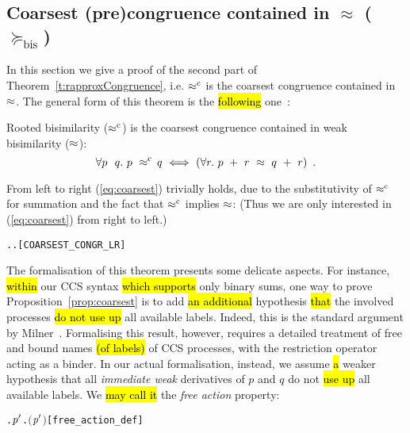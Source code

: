 
\subsection{Coarsest (pre)congruence contained in $\approx$ ($\succeq_{\mathrm{bis}}$)}
\label{s:coarsest}

In this section we give a proof of the second part of
Theorem~\ref{t:rapproxCongruence}, i.e. $\mathrel{\approx^{\rm{c}}}$ is the coarsest
congruence contained in $\approx$. 
The general form of this theorem is the \hl{following}
one~\cite{van2005characterisation,Gorrieri:2015jt,Mil89}:
\begin{proposition}
\label{prop:coarsest}
  Rooted bisimilarity ($\mathrel{\approx^{\rm{c}}}$) is the coarsest congruence
    contained in weak bisimilarity ($\approx$):
  \begin{equation}
    \label{eq:coarsest}
\forall p\ \ q.\ p\ \rapprox\ \! q\ \Longleftrightarrow\ ( \forall r.\ p\ +\
r\ \approx\ q\ +\ r )\enspace.
\end{equation}
\end{proposition}
From left to right (\ref{eq:coarsest}) trivially holds, due to the substitutivity of
$\mathrel{\approx^{\rm{c}}}$ for summation and the fact that $\mathrel{\approx^{\rm{c}}}$ implies $\approx$: (Thus we are only interested in (\ref{eq:coarsest}) from right to left.)
\begin{alltt}
\HOLTokenTurnstile{} \HOLSymConst{\HOLTokenForall{}} .  \HOLSymConst{\HOLTokenObsCongr}  \HOLSymConst{\HOLTokenImp{}} \HOLSymConst{\HOLTokenForall{}}.  \HOLSymConst{\ensuremath{+}}  \HOLSymConst{\HOLTokenWeakEQ}  \HOLSymConst{\ensuremath{+}} \hfill{[COARSEST_CONGR_LR]}
\end{alltt}

The formalisation of this theorem presents some 
delicate aspects. For instance, 
\hl{within} our CCS syntax \hl{which supports} only binary sums,
one way to prove Proposition~\ref{prop:coarsest} is
to add \hl{an additional} hypothesis \hl{that}
 the involved processes \hl{do not use up} all available labels.
 Indeed, this is the standard argument by Milner~\citep[p.~153]{Mil89}.
%
 Formalising this result, however, requires a detailed treatment of
 free and bound names \hl{(of labels)} of CCS
processes, with the restriction operator acting as a binder.
In our actual formalisation, instead,
we assume \hl{a} weaker hypothesis that all \emph{immediate weak} derivatives of
$p$ and $q$ do not \hl{use up} all available labels.
We \hl{may call it} the \emph{free action} property:
\begin{alltt}
     \HOLTokenDefEquality{} \HOLSymConst{\HOLTokenExists{}}. \HOLSymConst{\HOLTokenForall{}}\ensuremath{\HOLBoundVar{p}\sp{\prime}}. \HOLSymConst{\HOLTokenNeg{}}\ensuremath{(} \HOLTokenWeakTransBegin{} \HOLTokenWeakTransEnd \ensuremath{\HOLBoundVar{p}\sp{\prime}}\ensuremath{)}\hfill{[free_action_def]}
\end{alltt}

